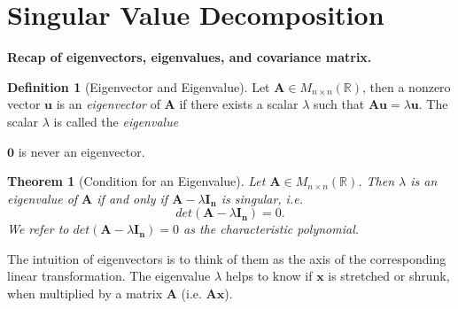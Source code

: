 \documentclass[12pt]{article}
\newtheorem{theorem}{Theorem}[section]
\theoremstyle{definition}
\newtheorem{definition}{Definition}[section]
\begin{document}




\section{Singular Value Decomposition}

\textbf{\large Recap of eigenvectors, eigenvalues, and covariance matrix.}
\begin{definition}[Eigenvector and Eigenvalue]
Let $\bm{A}\in M_{n\times n}(\mathbb{R})$, then a nonzero vector $\bm{u}$ is an \emph{eigenvector} of $\bm{A}$ if there exists a scalar $\lambda$ such that $\bm{Au}=\lambda\bm{u}$. The scalar $\lambda$ is called the \emph{eigenvalue}
\end{definition}

$\bm{0}$ is never an eigenvector.

\begin{theorem}[Condition for an Eigenvalue]
Let  $\bm{A}\in M_{n\times n}(\mathbb{R})$. Then $\lambda$ is an eigenvalue of $\bm{A}$ if and only if $\bm{A}-\lambda\bm{I_n}$ is singular, i.e.
\begin{equation}
det(\bm{A}-\lambda\bm{I_n})=0.    
\end{equation}
We refer to $det(\bm{A}-\lambda\bm{I_n})=0$ as the \emph{characteristic polynomial}.
\end{theorem}

The intuition of eigenvectors is to think of them as the axis of the corresponding linear transformation. The eigenvalue $\lambda$ helps to know if $\bm{x}$ is stretched or shrunk, when multiplied by a matrix $\bm{A}$ (i.e. $\bm{Ax}$).
\end{document}
